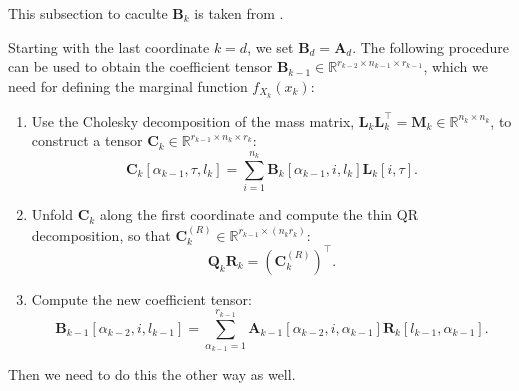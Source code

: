 This subsection to caculte $\bm{B}_k$  is taken from \cite{}.
\begin{prop}
	Starting with the last coordinate $k = d$, we set $\bm{B}_d = \bm{A}_d$. The following procedure can be used to obtain the coefficient tensor $\bm{B}_{k-1} \in \mathbb{R}^{r_{k-2} \times n_{k-1} \times r_{k-1}}$, which we need for defining the marginal function $f_{X_k}(x_k)$:
	\begin{enumerate}
		\item Use the Cholesky decomposition of the mass matrix, $\bm{L}_k \bm{L}_k^\top = \bm{M}_k \in \mathbb{R}^{n_k \times n_k}$, to construct a tensor $\bm{C}_k \in \mathbb{R}^{r_{k-1} \times n_k \times r_k}$:
		\begin{equation}
			\bm{C}_k[\alpha_{k-1}, \tau, l_k] = \sum_{i=1}^{n_k} \bm{B}_k[\alpha_{k-1}, i, l_k] \bm{L}_k[i, \tau].
		\end{equation}
		\item Unfold $\bm{C}_k$ along the first coordinate and compute the thin QR decomposition, so that $\bm{C}_k^{(R)} \in \mathbb{R}^{r_{k-1} \times (n_k r_k)}$:
		\begin{equation}
			\bm{Q}_k \bm{R}_k = {(\bm{C}_k^{(R)})}^{\top}.
		\end{equation}
		\item Compute the new coefficient tensor:
		\begin{equation}
			\bm{B}_{k-1}[\alpha_{k-2}, i, l_{k-1}] = \sum_{\alpha_{k-1}=1}^{r_{k-1}} \bm{A}_{k-1}[\alpha_{k-2}, i, \alpha_{k-1}] \bm{R}_k[l_{k-1}, \alpha_{k-1}].
		\end{equation}
	\end{enumerate}
\end{prop}

Then we need to do this the other way as well.


